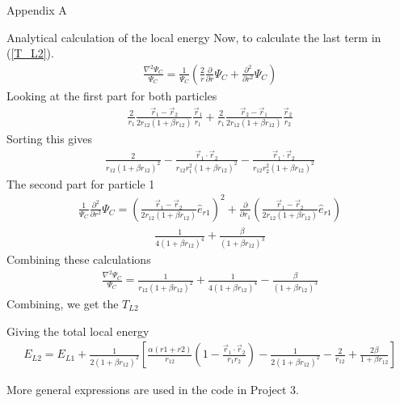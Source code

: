 \documentclass[a4paper, 12pt, titlepage]{article}
\begin{document}
\begin{section}{Appendix A}
\begin{subsection}{Analytical calculation of the local energy}
 Now, to calculate the last term in (\ref{T_L2}). 
 \begin{align}
 	\frac{\nabla^2 \Psi_C}{\Psi_C} = \frac{1}{\Psi_C} \left( \frac{2}{r} \frac{\partial}{\partial r}\Psi_C + \frac{\partial^2 }{\partial r^2} \Psi_C \right)
 \end{align}
 Looking at the first part for both particles
 \begin{align*}
 	\frac{2}{r_1} \frac{\vec r_1 - \vec r_2}{2r_{12} \left(1+\beta r_{12} \right)} \frac{\vec r_1}{r_1} + \frac{2}{r_1} \frac{\vec r_2 - \vec r_1}{2r_{12} \left(1+\beta r_{12} \right)} \frac{\vec r_2}{r_2}
 \end{align*}
 Sorting this gives
 \begin{align*}
 	\frac{2}{r_{12}(1+\beta r_{12})^2} - \frac{\vec r_1 \cdot \vec r_2}{r_{12} r_1^2 (1 +\beta r_{12})^2} - \frac{\vec r_1 \cdot \vec r_2}{r_{12} r_2^2 (1+\beta r_{12})^2}
 \end{align*}
 The second part for particle 1
 \begin{align*}
 	\frac{1}{\Psi_C} \frac{\partial^2 }{\partial r^2} \Psi_C = \left( \frac{\vec r_1 - \vec r_2}{2r_{12} \left(1+\beta r_{12} \right)} \hat e_{r1} \right)^2 + \frac{\partial}{\partial r_1} \left( \frac{\vec r_1 - \vec r_2}{2r_{12} \left(1+\beta r_{12}  \right)} \hat e_{r1} \right) 
 \end{align*}
 \begin{align*}
 	\frac{1}{4(1+\beta r_{12})^4} + \frac{\beta}{(1+\beta r_{12})^3}
 \end{align*}
 Combining these calculations
 \begin{align*}
 	 \frac{\nabla^2 \Psi_C}{\Psi_C} = \frac{1}{r_{12}(1+\beta r_{12})^2} + \frac{1}{4(1+\beta r_{12})^4} - \frac{\beta}{(1+\beta r_{12})^3}
 \end{align*}
 Combining, we get the $T_{L2}$
 
 Giving the total local energy
 \begin{align*}
 	E_{L2} = E_{L1} + \frac{1}{2(1+\beta r_{12})^2} \left[ \frac{\alpha (r1+r2)}{r_{12}} \left(1 - \frac{\vec r_1 \cdot \vec r_2}{r_1 r_2} \right) - \frac{1}{2(1+\beta r_{12})^2} - \frac{2}{r_{12}} + \frac{2 \beta}{1 + \beta r_{12}} \right]
 \end{align*}

 More general expressions are used in the code in Project 3. 
 \end{subsection}
 \end{section}
\end{document}
